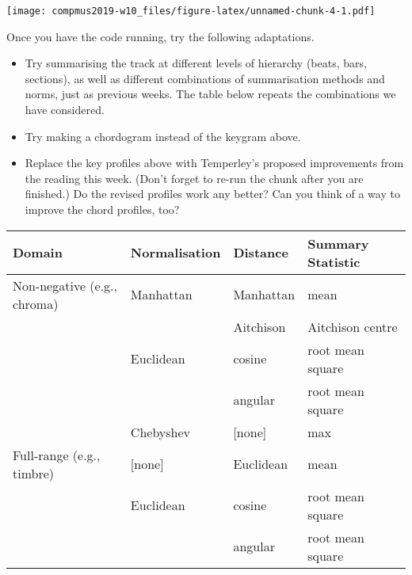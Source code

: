 \documentclass[]{article}
\newenvironment{Shaded}{\begin{snugshade}}{\end{snugshade}}
\newcommand{\DataTypeTok}[1]{\textcolor[rgb]{0.13,0.29,0.53}{#1}}
\newcommand{\DecValTok}[1]{\textcolor[rgb]{0.00,0.00,0.81}{#1}}
\newcommand{\KeywordTok}[1]{\textcolor[rgb]{0.13,0.29,0.53}{\textbf{#1}}}
\newcommand{\NormalTok}[1]{#1}
\newcommand{\OperatorTok}[1]{\textcolor[rgb]{0.81,0.36,0.00}{\textbf{#1}}}
\newcommand{\StringTok}[1]{\textcolor[rgb]{0.31,0.60,0.02}{#1}}
\providecommand{\tightlist}{%
  \setlength{\itemsep}{0pt}\setlength{\parskip}{0pt}}
\begin{document}
\begin{Shaded}
\end{Shaded}

\texttt{[image: compmus2019-w10\_files/figure-latex/unnamed-chunk-4-1.pdf]}

Once you have the code running, try the following adaptations.

\begin{itemize}
\tightlist
\item
  Try summarising the track at different levels of hierarchy (beats,
  bars, sections), as well as different combinations of summarisation
  methods and norms, just as previous weeks. The table below repeats the
  combinations we have considered.
\item
  Try making a chordogram instead of the keygram above.
\item
  Replace the key profiles above with Temperley's proposed improvements
  from the reading this week. (Don't forget to re-run the chunk after
  you are finished.) Do the revised profiles work any better? Can you
  think of a way to improve the chord profiles, too?
\end{itemize}

\begin{longtable}[]{@{}llll@{}}
\toprule
Domain & Normalisation & Distance & Summary Statistic\tabularnewline
\midrule
\endhead
Non-negative (e.g., chroma) & Manhattan & Manhattan &
mean\tabularnewline
& & Aitchison & Aitchison centre\tabularnewline
& Euclidean & cosine & root mean square\tabularnewline
& & angular & root mean square\tabularnewline
& Chebyshev & {[}none{]} & max\tabularnewline
Full-range (e.g., timbre) & {[}none{]} & Euclidean & mean\tabularnewline
& Euclidean & cosine & root mean square\tabularnewline
& & angular & root mean square\tabularnewline
\bottomrule
\end{longtable}
\end{document}
